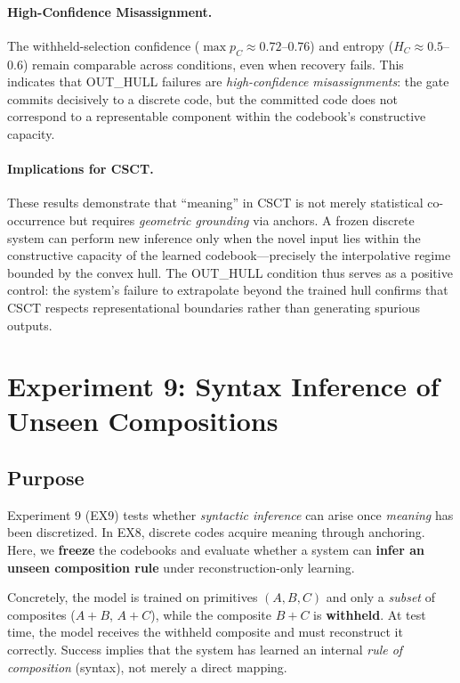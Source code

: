 \documentclass{article}
\begin{document}
\paragraph{High-Confidence Misassignment.}
The withheld-selection confidence ($\max p_C \approx 0.72$--$0.76$) and entropy ($H_C \approx 0.5$--$0.6$) remain comparable across conditions, even when recovery fails.
This indicates that OUT\_HULL failures are \emph{high-confidence misassignments}: the gate commits decisively to a discrete code, but the committed code does not correspond to a representable component within the codebook's constructive capacity.

\paragraph{Implications for CSCT.}
These results demonstrate that ``meaning'' in CSCT is not merely statistical co-occurrence but requires \emph{geometric grounding} via anchors.
A frozen discrete system can perform new inference only when the novel input lies within the constructive capacity of the learned codebook---precisely the interpolative regime bounded by the convex hull.
The OUT\_HULL condition thus serves as a positive control: the system's failure to extrapolate beyond the trained hull confirms that CSCT respects representational boundaries rather than generating spurious outputs.

\clearpage


\section{Experiment 9: Syntax Inference of Unseen Compositions}

\subsection{Purpose}
Experiment 9 (EX9) tests whether \emph{syntactic inference} can arise once \emph{meaning} has been discretized.
In EX8, discrete codes acquire meaning through anchoring.
Here, we \textbf{freeze} the codebooks and evaluate whether a system can \textbf{infer an unseen composition rule} under reconstruction-only learning.

Concretely, the model is trained on primitives $(A, B, C)$ and only a \emph{subset} of composites ($A{+}B$, $A{+}C$), while the composite $B{+}C$ is \textbf{withheld}.
At test time, the model receives the withheld composite and must reconstruct it correctly.
Success implies that the system has learned an internal \emph{rule of composition} (syntax), not merely a direct mapping.
\end{document}
